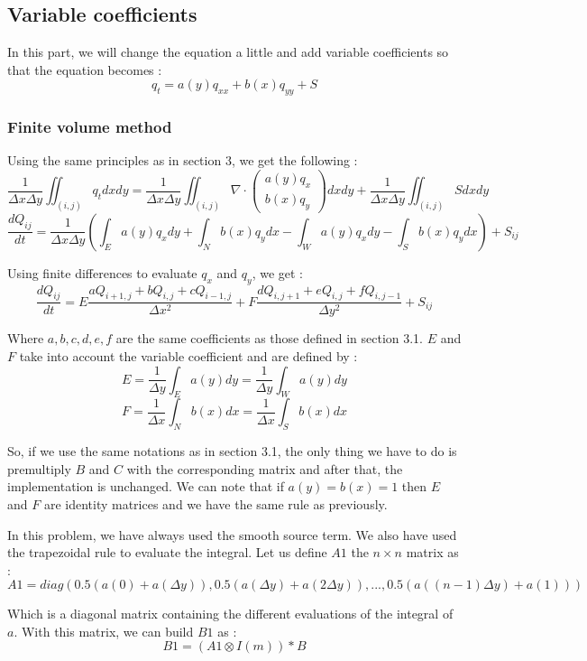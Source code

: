 \subsection{Variable coefficients}

In this part, we will change the equation a little and add variable coefficients so that the equation becomes : 
$$q_t = a(y)q_{xx}+b(x)q_{yy}+S$$
\subsubsection{Finite volume method}

Using the same principles as in section 3, we get the following :
$$\frac{1}{\Delta x \Delta y} \iint_{(i,j)} q_tdxdy = \frac{1}{\Delta x \Delta y} \iint_{(i,j)} \nabla \cdot \left(\begin{array}{c}
a(y)q_x \\ 
b(x)q_y
\end{array}\right) dxdy + \frac{1}{\Delta x \Delta y}\iint_{(i,j)}Sdxdy $$ 
$$\frac{dQ_{ij}}{dt} = \frac{1}{\Delta x \Delta y}(\int_E a(y)q_xdy + \int_N b(x)q_ydx - \int_Wa(y)q_xdy - \int_S b(x)q_ydx) + S_{ij}$$

Using finite differences to evaluate $q_x$ and $q_y$, we get : 
$$\frac{dQ_{ij}}{dt} = E\frac{aQ_{i+1,j}+bQ_{i,j}+cQ_{i-1,j}}{\Delta x^2}+F\frac{dQ_{i,j+1}+eQ_{i,j}+fQ_{i,j-1}}{\Delta y^2}+S_{ij}$$

Where $a,b,c,d,e,f$ are the same coefficients as those defined in section 3.1. $E$ and $F$ take into account the variable coefficient and are defined by : 
$$E = \frac{1}{\Delta y}\int_E a(y)dy= \frac{1}{\Delta y}\int_W a(y)dy$$
$$F = \frac{1}{\Delta x}\int_N b(x)dx= \frac{1}{\Delta x}\int_S b(x)dx$$

So, if we use the same notations as in section 3.1, the only thing we have to do is premultiply $B$ and $C$ with the corresponding matrix and after that, the implementation is unchanged. We can note that if $a(y)=b(x)=1$ then $E$ and $F$ are identity matrices and we have the same rule as previously.

In this problem, we have always used the smooth source term. We also have used the trapezoidal rule to evaluate the integral. Let us define $A1$ the $n \times n$ matrix as :
$$A1 = diag(0.5(a(0)+a(\Delta y)),0.5(a(\Delta y)+a(2\Delta y)),...,0.5(a((n-1)\Delta y)+a(1)))$$

Which is a diagonal matrix containing the different evaluations of the integral of $a$. With this matrix, we can build $B1$ as :
$$B1 = (A1\otimes I(m))*B$$

